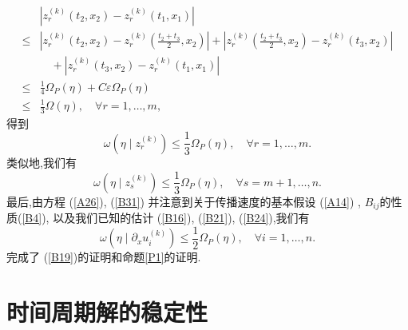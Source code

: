 \documentclass[notitlepage,cs4size,punct,oneside]{ctexrep}
\numberwithin{equation}{chapter}
\theoremstyle{mystyle}
\begin{document}
\begin{align}
         & \left|z_{r}^{(k)}\left(t_{2}, x_{2}\right)-z_{r}^{(k)}\left(t_{1}, x_{1}\right)\right|\nonumber                                                                                                                        \\
    \leq & \left|z_{r}^{(k)}\left(t_{2}, x_{2}\right)-z_{r}^{(k)}\left(\frac{t_{2}+t_{3}}{2}, x_{2}\right)\right|+\left|z_{r}^{(k)}\left(\frac{t_{2}+t_{3}}{2}, x_{2}\right)-z_{r}^{(k)}\left(t_{3}, x_{2}\right)\right|\nonumber \\
         & \quad+\left|z_{r}^{(k)}\left(t_{3}, x_{2}\right)-z_{r}^{(k)}\left(t_{1}, x_{1}\right)\right|\nonumber                                                                                                                  \\
    \leq & \frac{1}{4} \Omega_{P}(\eta)+C \varepsilon \Omega_{P}(\eta)\nonumber                                                                                                                                                   \\
    \leq & \frac{1}{3} \Omega(\eta), \quad \forall r=1, \ldots, m,\label{B76}
\end{align}
得到
\begin{equation} \label{B77}
    \omega\left(\eta \mid z_{r}^{(k)}\right) \leq \frac{1}{3} \Omega_{P}(\eta), \quad \forall r=1, \ldots, m.
\end{equation}
类似地,我们有
\begin{equation} \label{B78}
    \omega\left(\eta \mid z_{s}^{(k)}\right) \leq \frac{1}{3} \Omega_{P}(\eta), \quad \forall s=m+1, \ldots, n.
\end{equation}
最后,由方程 (\ref{A26}), (\ref{B31}) 并注意到关于传播速度的基本假设 (\ref{A14}) , $B_{i j}$的性质(\ref{B4}), 以及我们已知的估计 (\ref{B16}), (\ref{B21}), (\ref{B24}),我们有
\begin{equation} \label{B79}
    \omega\left(\eta \mid \partial_{x} u_{i}^{(k)}\right) \leq \frac{1}{2} \Omega_{P}(\eta), \quad \forall i=1, \ldots, n.
\end{equation}
完成了 (\ref{B19})的证明和命题\ref{P1}的证明.

\chapter{时间周期解的稳定性}
\end{document}
